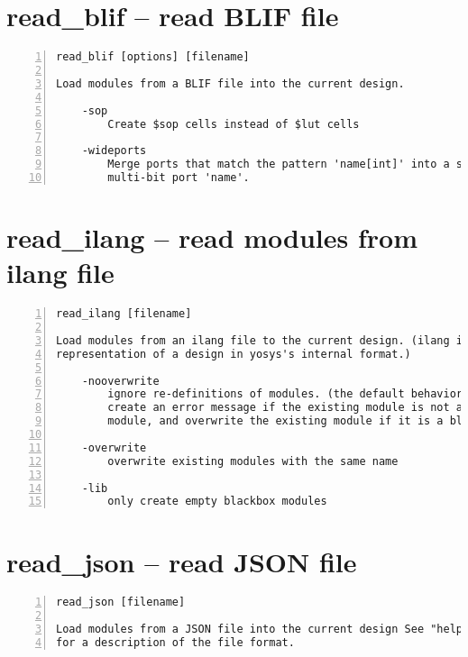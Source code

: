 \section{read\_blif -- read BLIF file}
\label{cmd:read_blif}
\begin{lstlisting}[numbers=left,frame=single]
    read_blif [options] [filename]

Load modules from a BLIF file into the current design.

    -sop
        Create $sop cells instead of $lut cells

    -wideports
        Merge ports that match the pattern 'name[int]' into a single
        multi-bit port 'name'.
\end{lstlisting}

\section{read\_ilang -- read modules from ilang file}
\label{cmd:read_ilang}
\begin{lstlisting}[numbers=left,frame=single]
    read_ilang [filename]

Load modules from an ilang file to the current design. (ilang is a text
representation of a design in yosys's internal format.)

    -nooverwrite
        ignore re-definitions of modules. (the default behavior is to
        create an error message if the existing module is not a blackbox
        module, and overwrite the existing module if it is a blackbox module.)

    -overwrite
        overwrite existing modules with the same name

    -lib
        only create empty blackbox modules
\end{lstlisting}

\section{read\_json -- read JSON file}
\label{cmd:read_json}
\begin{lstlisting}[numbers=left,frame=single]
    read_json [filename]

Load modules from a JSON file into the current design See "help write_json"
for a description of the file format.
\end{lstlisting}

